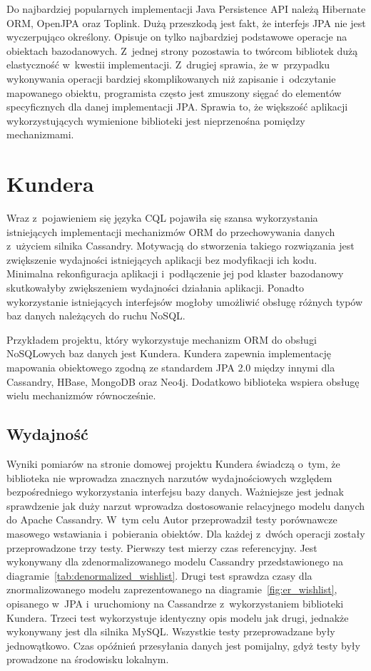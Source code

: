 Do najbardziej popularnych implementacji Java Persistence API należą Hibernate ORM, OpenJPA oraz Toplink. Dużą przeszkodą jest fakt, że interfejs JPA nie jest wyczerpująco określony. Opisuje on tylko najbardziej podstawowe operacje na obiektach bazodanowych. Z~jednej strony pozostawia to twórcom bibliotek dużą elastyczność w~kwestii implementacji. Z~drugiej sprawia, że w~przypadku wykonywania operacji bardziej skomplikowanych niż zapisanie i~odczytanie mapowanego obiektu, programista często jest zmuszony sięgać do elementów specyficznych dla danej implementacji JPA. Sprawia to, że większość aplikacji wykorzystujących wymienione biblioteki jest nieprzenośna pomiędzy mechanizmami.

\section{Kundera}
\label{sec:kundera}

Wraz z~pojawieniem się języka CQL pojawiła się szansa wykorzystania istniejących implementacji mechanizmów ORM do przechowywania danych z~użyciem silnika Cassandry. Motywacją do stworzenia takiego rozwiązania jest zwiększenie wydajności istniejących aplikacji bez modyfikacji ich kodu. Minimalna rekonfiguracja aplikacji i~podłączenie jej pod klaster bazodanowy skutkowałyby zwiększeniem wydajności działania aplikacji. Ponadto wykorzystanie istniejących interfejsów mogłoby umożliwić obsługę różnych typów baz danych należących do ruchu NoSQL. 

Przykładem projektu, który wykorzystuje mechanizm ORM do obsługi NoSQLowych baz danych jest Kundera.\cite{kundera_home} Kundera zapewnia implementację mapowania obiektowego zgodną ze standardem JPA 2.0 między innymi dla Cassandry, HBase, MongoDB oraz Neo4j. Dodatkowo biblioteka wspiera obsługę wielu mechanizmów równocześnie.

\subsection{Wydajność}
\label{sec:kundera_performance}

Wyniki pomiarów na stronie domowej projektu Kundera świadczą o~tym, że biblioteka nie wprowadza znacznych narzutów wydajnościowych względem bezpośredniego wykorzystania interfejsu bazy danych. Ważniejsze jest jednak sprawdzenie jak duży narzut wprowadza dostosowanie relacyjnego modelu danych do Apache Cassandry. W~tym celu Autor przeprowadził testy porównawcze masowego wstawiania i~pobierania obiektów. Dla każdej z~dwóch operacji zostały przeprowadzone trzy testy. Pierwszy test mierzy czas referencyjny. Jest wykonywany dla zdenormalizowanego modelu Cassandry przedstawionego na diagramie~\ref{tab:denormalized_wishlist}. Drugi test sprawdza czasy dla znormalizowanego modelu zaprezentowanego na diagramie~\ref{fig:er_wishlist}, opisanego w~JPA i~uruchomiony na Cassandrze z~wykorzystaniem biblioteki Kundera. Trzeci test wykorzystuje identyczny opis modelu jak drugi, jednakże wykonywany jest dla silnika MySQL. Wszystkie testy przeprowadzane były jednowątkowo. Czas opóźnień przesyłania danych jest pomijalny, gdyż testy były prowadzone na środowisku lokalnym.

